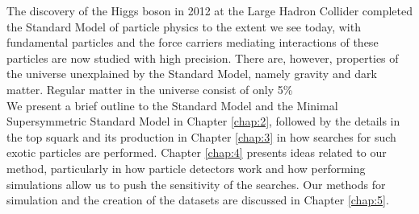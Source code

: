 The discovery of the Higgs boson in 2012 at the Large Hadron Collider completed the Standard Model of particle physics to the extent we see today, with fundamental particles and the force carriers mediating interactions of these particles are now studied with high precision. There are, however, properties of the universe unexplained by the Standard Model, namely gravity and dark matter. Regular matter in the universe consist of only 5\% \\

We present a brief outline to the Standard Model and the Minimal Supersymmetric Standard Model in Chapter \ref{chap:2}, followed by the details in the top squark and its production in Chapter \ref{chap:3} in how searches for such exotic particles are performed. Chapter \ref{chap:4} presents ideas related to our method, particularly in how particle detectors work and how performing simulations allow us to push the sensitivity of the searches. Our methods for simulation and the creation of the datasets are discussed in Chapter \ref{chap:5}.